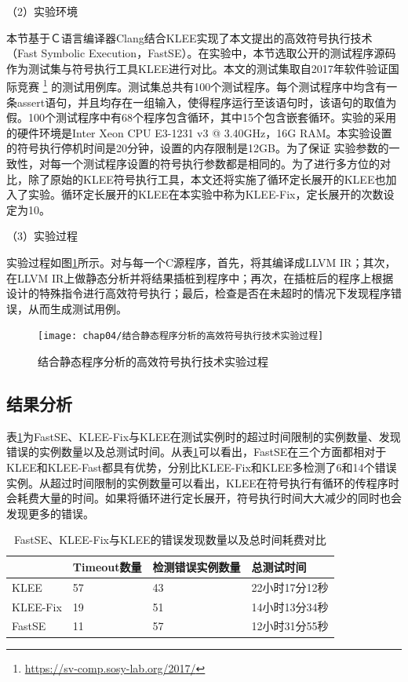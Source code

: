 （2）实验环境

本节基于Ｃ语言编译器Clang结合KLEE实现了本文提出的高效符号执行技术（Fast Symbolic Execution，FastSE）。在实验中，本节选取公开的测试程序源码作为测试集与符号执行工具KLEE进行对比。本文的测试集取自2017年软件验证国际竞赛
\footnote{\url{https://sv-comp.sosy-lab.org/2017/}}
的测试用例库。测试集总共有100个测试程序。每个测试程序中均含有一条assert语句，并且均存在一组输入，使得程序运行至该语句时，该语句的取值为假。100个测试程序中有68个程序包含循环，其中15个包含嵌套循环。实验的采用的硬件环境是Inter Xeon CPU E3-1231 v3 @ 3.40GHz，16G RAM。本实验设置的符号执行停机时间是20分钟，设置的内存限制是12GB。为了保证
实验参数的一致性，对每一个测试程序设置的符号执行参数都是相同的。为了进行多方位的对比，除了原始的KLEE符号执行工具，本文还将实施了循环定长展开的KLEE也加入了实验。循环定长展开的KLEE在本实验中称为KLEE-Fix，定长展开的次数设定为10。

（3）实验过程

实验过程如图\ref{experiment_procedure}所示。对与每一个C源程序，首先，将其编译成LLVM IR；其次，在LLVM IR上做静态分析并将结果插桩到程序中；再次，在插桩后的程序上根据设计的特殊指令进行高效符号执行；最后，检查是否在未超时的情况下发现程序错误，从而生成测试用例。

\begin{figure}[h]
	\centering
	\texttt{[image: chap04/结合静态程序分析的高效符号执行技术实验过程]}
	\caption{结合静态程序分析的高效符号执行技术实验过程}
	\label{experiment_procedure}
\end{figure}

\subsection{结果分析}
表\ref{FastSE_KLEE-Fix与KLEE的发现错误数量以及总时间耗费对比}为FastSE、KLEE-Fix与KLEE在测试实例时的超过时间限制的实例数量、发现错误的实例数量以及总测试时间。从表\ref{FastSE_KLEE-Fix与KLEE的发现错误数量以及总时间耗费对比}可以看出，FastSE在三个方面都相对于KLEE和KLEE-Fast都具有优势，分别比KLEE-Fix和KLEE多检测了6和14个错误实例。从超过时间限制的实例数量可以看出，KLEE在符号执行有循环的传程序时会耗费大量的时间。如果将循环进行定长展开，符号执行时间大大减少的同时也会发现更多的错误。

\begin{table}[ht]
\begin{center}
\caption{FastSE、KLEE-Fix与KLEE的错误发现数量以及总时间耗费对比}
\label{FastSE_KLEE-Fix与KLEE的发现错误数量以及总时间耗费对比}
\begin{small}
\begin{tabular}{|l|l|l|l|}
\hline
{\bf } & {\bf Timeout数量} & {\bf 检测错误实例数量} & {\bf 总测试时间} \\
\hline
KLEE & 57 & 43 & 22小时17分12秒 \\
KLEE-Fix & 19 & 51 & 14小时13分34秒\\
FastSE & 11 & 57 & 12小时31分55秒\\
\hline
\end{tabular}
\end{small}
\end{center}
\end{table}

